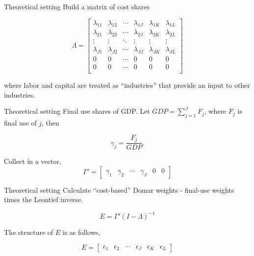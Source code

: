 \documentclass[10pt,xcolor=dvipsnames]{beamer}
\begin{document}
\begin{frame}{Theoretical setting}
Build a matrix of cost shares

\begin{equation}
  \Lambda = 
  \begin{bmatrix}
    \lambda_{11} & \lambda_{12} & \cdots & \lambda_{1J} & \lambda_{1K} & \lambda_{1L} \\
    \lambda_{21} & \lambda_{22} & \cdots & \lambda_{2J} & \lambda_{2K} & \lambda_{2L} \\
    \vdots       & \vdots       & \ddots & \vdots       & \vdots       & \vdots  \\
    \lambda_{J1} & \lambda_{J2} & \cdots & \lambda_{JJ} & \lambda_{JK} & \lambda_{JL} \\
    0 & 0 & \cdots & 0 & 0& 0 \\
    0 & 0 & \cdots & 0 & 0& 0 \\
  \end{bmatrix}
\end{equation}

where labor and capital are treated as ``industries'' that provide an input to other industries.

\end{frame}


\begin{frame}{Theoretical setting}
Final use shares of GDP. Let $GDP = \sum_{j=1}^J F_j$, where $F_j$ is final use of $j$, then

\begin{equation}
  \gamma_j = \frac{F_j}{GDP}.
\end{equation}

Collect in a vector,
\begin{equation}
  \Gamma' = 
  \begin{bmatrix}
    \gamma_1 &
    \gamma_2 &
    \cdots &
    \gamma_J &
    0 &
    0
  \end{bmatrix}
\end{equation}

\end{frame}

\begin{frame}{Theoretical setting}
Calculate ``cost-based'' Domar weights - final-use weights times the Leontief inverse. 

\begin{equation}
  E = \Gamma' (I - \Lambda)^{-1} \label{EQ_E}
\end{equation}

The structure of $E$ is as follows,

\begin{equation}
  E = 
  \begin{bmatrix}
    \epsilon_1 &
    \epsilon_2 &
    \cdots &
    \epsilon_J &
    \epsilon_K &
    \epsilon_L
  \end{bmatrix}
\end{equation}

\end{frame}
\end{document}
